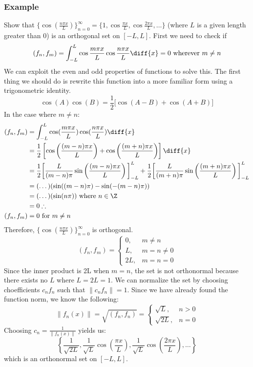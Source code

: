 \documentclass{math}
\begin{document}
\subsubsection*{Example}
Show that \( \{\cos(\frac{n\pi x}{L})\}_{n=0}^{\infty} = \{1,
\cos\frac{\pi x}{L},\cos\frac{2\pi x}{L},\dots\} \) (where \( L \) is a given
length greater than 0) is an orthogonal set on \( [-L,L] \). First we need to
check if
\[ (f_n,f_m) = \int_{-L}^{L}\cos\frac{m\pi x}{L}\cos\frac{n\pi x}{L}\diff{x} =
  0 \text{ wherever } m\ne n \]
We can exploit the even and odd properties of functions to solve this. The first
thing we should do is rewrite this function into a more familiar form using a
trigonometric identity.
\[ \cos(A)\cos(B) = \frac{1}{2}\bigg[\cos(A-B)+\cos(A+B)\bigg] \]
In the case where \( m\ne n \):
\begin{align*}
  (f_n,f_m) &= \int_{-L}^{L}\cos(\frac{m\pi x}{L})
    \cos(\frac{n\pi x}{L})\diff{x} \\
  &= \frac{1}{2}\left[\cos\left(\frac{(m-n)\pi x}{L}\right)+
    \cos\left(\frac{(m+n)\pi x}{L}\right)\right]\diff{x} \\
  &= \frac{1}{2}\bigg[\frac{L}{(m-n)\pi}
    \sin\left(\frac{(m-n)\pi x}{L}\right)\bigg]_{-L}^{L}+
    \frac{1}{2}\bigg[\frac{L}{(m+n)\pi}
    \sin\left(\frac{(m+n)\pi x}{L}\right)\bigg]_{-L}^{L} \\
  &= (\dots)(\sin((m-n)\pi)-\sin(-(m-n)\pi)) \\
  &= (\dots)(\sin(n\pi)) \text{ where } n\in\Z \\
  &= 0 \therefore \\
  (f_n,f_m) &= 0 \text{ for } m\ne n
\end{align*}
Therefore, \( \{\cos(\frac{n\pi x}{L})\}_{n=0}^{\infty} \) is orthogonal.
\[ (f_n,f_m) = \begin{cases}
  0, & m\ne n \\
  L, & m = n\ne 0 \\
  2L, & m = n = 0
\end{cases} \]
Since the inner product is 2L when \( m = n \), the set is not orthonormal
because there exists no \( L \) where \( L = 2L = 1 \). We can normalize the set
by choosing choefficients \( c_nf_n \) such that \( \|c_nf_n\| = 1 \). Since we
have already found the function norm, we know the following:
\[ \|f_n(x)\| = \sqrt{(f_n,f_n)} = \begin{cases}
  \sqrt{L}, & n>0 \\
  \sqrt{2L}, & n = 0
\end{cases} \]
Choosing \( c_n = \frac{1}{\|f_n(x)\|} \) yields us:
\[ \left\{\frac{1}{\sqrt{2L}},\frac{1}{\sqrt{L}}\cos(\frac{\pi x}{L}),
  \frac{1}{\sqrt{L}}\cos(\frac{2\pi x}{L}),\dots\right\} \]
which is an orthonormal set on \( [-L,L] \).
\end{document}
